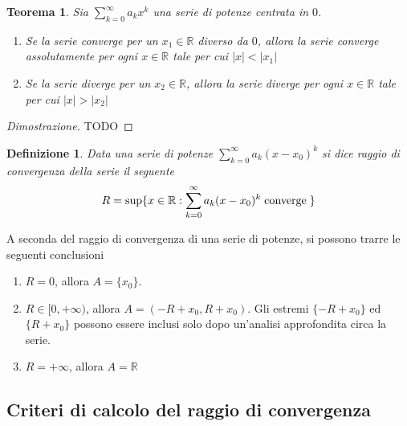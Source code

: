\documentclass{article}
\newtheorem{theorem}{Teorema}
\newtheorem{definition}{Definizione}
\begin{document}
        \vspace{10pt}
        \begin{theorem}
            Sia $\sum_{k = 0}^{\infty} a_{k}x^{k}$ una serie di potenze centrata in $0$.
            \begin{enumerate}
                \item Se la serie converge per un $x_{1} \in \mathbb{R}$ diverso da $0$, allora la serie converge assolutamente per ogni $x \in \mathbb{R}$ tale per cui $|x| < |x_{1}|$
                \item Se la serie diverge per un $x_{2} \in \mathbb{R}$, allora la serie diverge per ogni $x \in \mathbb{R}$ tale per cui $|x| > |x_{2}|$
            \end{enumerate}
        \end{theorem}

        \begin{proof}[Dimostrazione]
            TODO
        \end{proof}

        \vspace{10pt}
        \begin{definition}
            Data una serie di potenze $\sum_{k = 0}^{\infty} a_{k}(x - x_{0})^{k}$ si dice raggio di convergenza della serie il seguente
            \[
                R = \sup\{ x \in \mathbb{R} : \sum_{k = 0}^{\infty} a_{k}(x - x_{0})^{k} \; \textnormal{converge} \; \}
            \]
        \end{definition}
        
        A seconda del raggio di convergenza di una serie di potenze, si possono trarre le seguenti conclusioni
        \begin{enumerate}[label=(\arabic*)]
            \item $R = 0$, allora $A = \{x_{0}\}$.
            \item $R \in [0, +\infty)$, allora $A = (-R + x_{0}, R + x_{0})$. Gli estremi $\{-R + x_{0}\}$ ed $\{R + x_{0}\}$ possono essere inclusi solo dopo un'analisi approfondita circa la serie.
            \item $R = +\infty$, allora $A = \mathbb{R}$
        \end{enumerate}
   
        

        \vspace{10pt}
        \subsection{Criteri di calcolo del raggio di convergenza}
\end{document}
